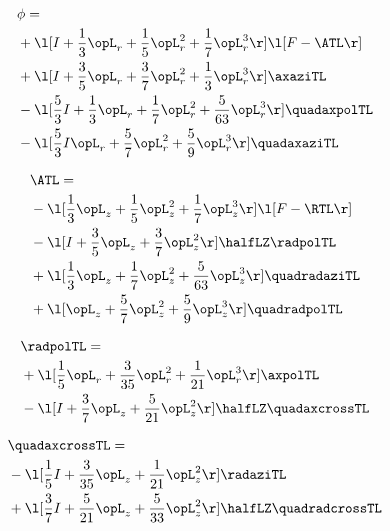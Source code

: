 \begin{alignat}{2} 
\label{eq:scalarFlux_0} 
& \phi = \\ 
& + \l[ I + \frac{1}{3} \opL_r + \frac{1}{5} \opL_r^{2} + \frac{1}{7} \opL_r^{3}  \r] \l[ F - \ATL \r] \nonumber \\ 
& + \l[ I + \frac{3}{5} \opL_r + \frac{3}{7} \opL_r^{2} + \frac{1}{3} \opL_r^{3}  \r] \axaziTL \nonumber \\ 
& - \l[ \frac{5}{3} I + \frac{1}{3} \opL_r + \frac{1}{7} \opL_r^{2} + \frac{5}{63} \opL_r^{3}  \r] \quadaxpolTL \nonumber \\ 
& - \l[ \frac{5}{3} I \opL_r + \frac{5}{7} \opL_r^{2} + \frac{5}{9} \opL_r^{3}  \r] \quadaxaziTL \nonumber \\ 
\end{alignat} 


\begin{alignat}{2} 
\label{eq:isoATL_0} 
& \ATL = \\ 
& - \l[ \frac{1}{3} \opL_z + \frac{1}{5} \opL_z^{2} + \frac{1}{7} \opL_z^{3}  \r] \l[ F - \RTL \r] \nonumber \\ 
& - \l[ I + \frac{3}{5} \opL_z + \frac{3}{7} \opL_z^{2}  \r] \halfLZ \radpolTL \nonumber \\ 
& + \l[ \frac{1}{3} \opL_z + \frac{1}{7} \opL_z^{2} + \frac{5}{63} \opL_z^{3}  \r] \quadradaziTL \nonumber \\ 
& + \l[ \opL_z + \frac{5}{7} \opL_z^{2} + \frac{5}{9} \opL_z^{3}  \r] \quadradpolTL \nonumber \\ 
\end{alignat} 


\begin{alignat}{2} 
\label{eq:linradpolTL_0} 
& \radpolTL = \\ 
& + \l[ \frac{1}{5} \opL_r + \frac{3}{35} \opL_r^{2} + \frac{1}{21} \opL_r^{3}  \r] \axpolTL \nonumber \\ 
& - \l[ I + \frac{3}{7} \opL_z + \frac{5}{21} \opL_z^{2}  \r] \halfLZ \quadaxcrossTL \nonumber \\ 
\end{alignat} 


\begin{alignat}{2} 
\label{eq:quadaxcrossTL_0} 
& \quadaxcrossTL = \\ 
& - \l[ \frac{1}{5} I + \frac{3}{35} \opL_z + \frac{1}{21} \opL_z^{2}  \r] \radaziTL \nonumber \\ 
& + \l[ \frac{3}{7} I + \frac{5}{21} \opL_z + \frac{5}{33} \opL_z^{2}  \r] \halfLZ \quadradcrossTL \nonumber \\ 
\end{alignat} 


